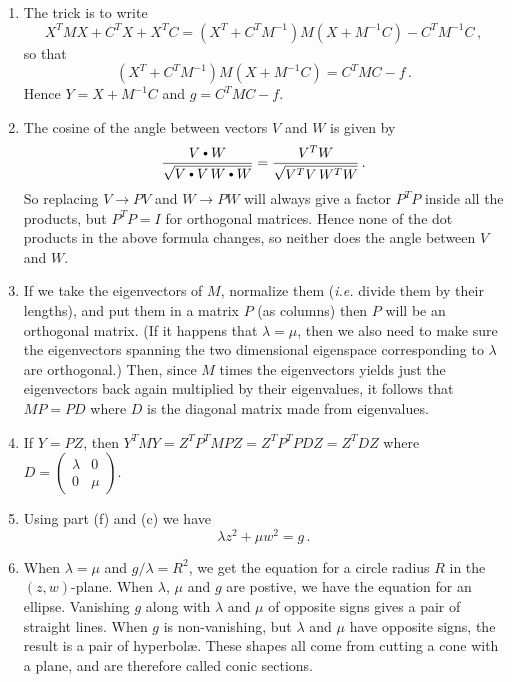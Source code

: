 \begin{enumerate}
\begin{enumerate}
To find the eigenvalues notice that $\det\begin{pmatrix}a-\lambda&b\\b&d-\lambda\end{pmatrix}
=(a-\lambda)(d-\lambda)-b^2=\big(\lambda-\frac{a+d}{2}\big)^2-b^2-\big(\frac{a-d}{2}\big)^2$.
So the eigenvalues are \[\lambda=\frac{a+d}{2}+\sqrt{b^2+\big(\frac{a-d}{2}\big)^2}
\mbox{ and } \mu=\frac{a+d}{2}-\sqrt{b^2+\big(\frac{a-d}{2}\big)^2}\, .\]
\item The trick is to write
\[X^T M X + C^T X + X^T C =(X^T+C^T M^{-1}) M (X+M^{-1} C) - C^T M^{-1} C\, ,\]
so that
\[(X^T+C^T M^{-1}) M (X+M^{-1} C) = C^T M C -f\, .\]
Hence $Y=X+M^{-1} C$ and $g=C^T M C -f$.
\item The cosine of the angle between vectors $V$ and $W$ is given by \[\frac{V\dotprod W}{\sqrt{V\dotprod V\, W\dotprod W}}=\frac{V^T W}{\sqrt{V^T V\, W^T W}}\, .\] 
So replacing $V\to PV$ and $W\to PW$ will always give a factor $P^T P$ inside all the products, but $P^TP=I$ for orthogonal matrices. Hence none of the dot products in the above formula changes, so 
neither does the angle between $V$ and $W$.
\item If we take the eigenvectors of $M$, normalize them ({\itshape i.e.} divide them by their lengths),
and put them in a matrix $P$ (as columns) then $P$ will be an orthogonal matrix. (If it happens
that $\lambda=\mu$, then we also need to make sure the eigenvectors spanning the two dimensional
eigenspace corresponding to $\lambda$ are orthogonal.) Then, since $M$ times the eigenvectors
yields just the eigenvectors back again multiplied by their eigenvalues, it follows that $MP=PD$
where $D$ is the diagonal matrix made from eigenvalues.
\item If $Y=PZ$, then $Y^T M Y= Z^T P^T M P Z = Z^T P^T P D Z = Z^T D Z$ where $D=\begin{pmatrix}\lambda & 0 \\ 0&\mu \end{pmatrix}$.
\item Using part (f) and (c) we have 
\[\lambda z^2 + \mu w^2 = g\, .\]
\item When $\lambda=\mu$ and $g/\lambda=R^2$, we get the equation for a circle radius $R$ in the $(z,w)$-plane. When $\lambda$, $\mu$ and $g$ are postive, we have the equation for an ellipse. Vanishing $g$ along with $\lambda$ and $\mu$ of opposite signs gives a pair of straight lines.
When $g$ is non-vanishing, but $\lambda$ and $\mu$ have opposite signs, the result is a pair of hyperbol\ae. These shapes all come from cutting a cone with a plane, and are therefore called
conic sections.
\end{enumerate}


\end{enumerate}
